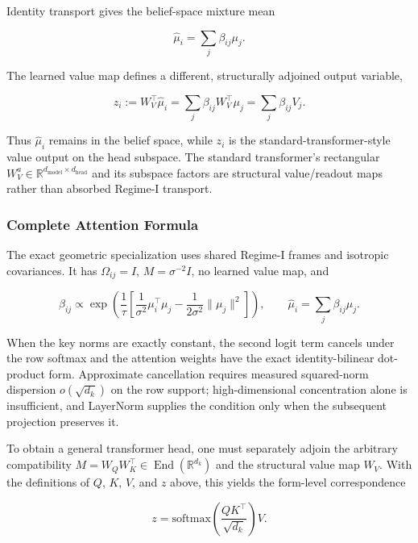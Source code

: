 \documentclass[twoside,11pt]{article}
\begin{document}
Identity transport gives the belief-space mixture mean

\begin{equation}
\hat\mu_i = \sum_j\beta_{ij}\mu_j.
\end{equation}

The learned value map defines a different, structurally adjoined output variable,

\begin{equation}
\boxed{z_i := W_V^\top\hat\mu_i = \sum_j\beta_{ij}W_V^\top\mu_j = \sum_j\beta_{ij}V_j}.
\end{equation}

Thus $\hat\mu_i$ remains in the belief space, while $z_i$ is the standard-transformer-style value output on the head subspace. The standard transformer's rectangular $W_V^a \in \mathbb{R}^{d_{\text{model}} \times d_{\text{head}}}$ and its subspace factors are structural value/readout maps rather than absorbed Regime-I transport.

\subsubsection{Complete Attention Formula}

The exact geometric specialization uses shared Regime-I frames and isotropic covariances. It has $\Omega_{ij}=I$, $M=\sigma^{-2}I$, no learned value map, and

\begin{equation}
\beta_{ij} \propto \exp\left(\frac{1}{\tau}\left[\frac{1}{\sigma^2}\mu_i^\top\mu_j - \frac{1}{2\sigma^2}\|\mu_j\|^2\right]\right),
\qquad
\hat\mu_i = \sum_j\beta_{ij}\mu_j.
\end{equation}

When the key norms are exactly constant, the second logit term cancels under the row softmax and the attention weights have the exact identity-bilinear dot-product form. Approximate cancellation requires measured squared-norm dispersion $o(\sqrt{d_k})$ on the row support; high-dimensional concentration alone is insufficient, and LayerNorm supplies the condition only when the subsequent projection preserves it.

To obtain a general transformer head, one must separately adjoin the arbitrary compatibility $M=W_QW_K^\top \in \operatorname{End}(\mathbb{R}^{d_k})$ and the structural value map $W_V$. With the definitions of $Q$, $K$, $V$, and $z$ above, this yields the form-level correspondence

\begin{equation}
\boxed{z = \mathrm{softmax}\left(\frac{QK^\top}{\sqrt{d_k}}\right)V}.
\end{equation}
\end{document}
